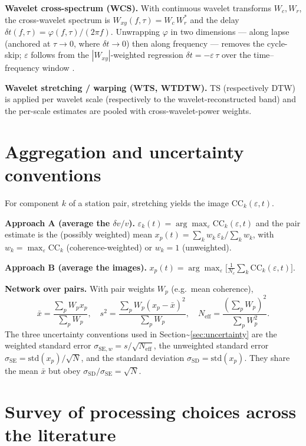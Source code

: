\documentclass[
  referee]{gji}
\providecommand{\dvv}{\ensuremath{\delta v/v}}
\begin{document}
\textbf{Wavelet cross-spectrum (WCS).} With continuous wavelet
transforms \(W_c,W_r\), the cross-wavelet spectrum is
\(W_{xy}(f,\tau)=W_c\,W_r^{*}\) and the delay \(\delta
t(f,\tau)=\varphi(f,\tau)/(2\pi f)\). Unwrapping \(\varphi\) in two
dimensions --- along lapse (anchored at \(\tau\!\to\!0\), where
\(\delta t\!\to\!0\)) then along frequency --- removes the cycle-skip;
\(\varepsilon\) follows from the \(|W_{xy}|\)-weighted regression
\(\delta t=-\varepsilon\,\tau\) over the time--frequency window
\citep{Mao2020}.

\textbf{Wavelet stretching / warping (WTS, WTDTW).} TS (respectively
DTW) is applied per wavelet scale (respectively to the
wavelet-reconstructed band) and the per-scale estimates are pooled with
cross-wavelet-power weights.

\section{Aggregation and uncertainty conventions}\label{app:aggregation}

For component \(k\) of a station pair, stretching yields the image
\(\mathrm{CC}_k(\varepsilon,t)\).

\textbf{Approach A (average the \dvv).}
\(\varepsilon_k(t)=\arg\max_{\varepsilon} \mathrm{CC}_k(\varepsilon,t)\)
and the pair estimate is the (possibly weighted) mean
\(x_p(t)=\sum_k w_k\,\varepsilon_k/\sum_k
w_k\), with \(w_k=\max_{\varepsilon} \mathrm{CC}_k\)
(coherence-weighted) or \(w_k=1\) (unweighted).

\textbf{Approach B (average the images).}
\(x_p(t)=\arg\max_{\varepsilon}\big[\tfrac1{N_c}\sum_k \mathrm{CC}_k(\varepsilon,t)\big]\).

\textbf{Network over pairs.} With pair weights \(W_p\) (e.g.~mean
coherence), \begin{equation}
\bar x=\frac{\sum_p W_p x_p}{\sum_p W_p},\quad
s^2=\frac{\sum_p W_p (x_p-\bar x)^2}{\sum_p W_p},\quad
N_{\mathrm{eff}}=\frac{(\sum_p W_p)^2}{\sum_p W_p^2}.
\end{equation} The three uncertainty conventions used in
Section\textasciitilde{}\ref{sec:uncertainty} are the weighted standard
error \(\sigma_{\mathrm{SE},w}=s/\sqrt{N_{\mathrm{eff}}}\), the
unweighted standard error
\(\sigma_{\mathrm{SE}}=\mathrm{std}(x_p)/\sqrt{N}\), and the standard
deviation \(\sigma_{\mathrm{SD}}=\mathrm{std}(x_p)\). They share the
mean \(\bar x\) but obey
\(\sigma_{\mathrm{SD}}/\sigma_{\mathrm{SE}}=\sqrt{N}\).

\section{Survey of processing choices across the
literature}\label{app:survey}
\end{document}
